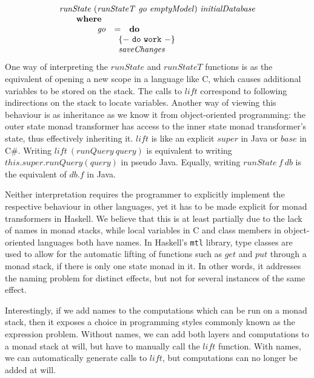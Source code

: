 \begin{displaymath}
\begin{array}{l}
\mathit{runState}~(\mathit{runStateT}~\mathit{go}~\mathit{emptyModel})~\mathit{initialDatabase} \\
\qquad \mathbf{where} \\
\qquad \qquad \begin{array}{lcl}
\mathit{go} & = & \mathbf{do} \\
\multicolumn{3}{l}{\qquad \begin{array}{l}
\mathtt{\{-~do~work~-\}}\\
\mathit{saveChanges}
\end{array}} 
\end{array}
\end{array}
\end{displaymath}
One way of interpreting the $\mathit{runState}$ and $\mathit{runStateT}$ functions is as the equivalent of opening a new scope in a language like C, which causes additional variables to be stored on the stack. The calls to $\mathit{lift}$ correspond to following indirections on the stack to locate variables. Another way of viewing this behaviour is as inheritance as we know it from object-oriented programming: the outer state monad transformer has access to the inner state monad transformer's state, thus effectively inheriting it. $\mathit{lift}$ is like an explicit $\mathit{super}$ in Java or $\mathit{base}$ in C\#. Writing $\mathit{lift}~(\mathit{runQuery}~\mathit{query})$ is equivalent to writing $\mathit{this}.\mathit{super}.\mathit{runQuery}(\mathit{query})$ in pseudo Java. Equally, writing $\mathit{runState}~f~\mathit{db}$ is the equivalent of $\mathit{db}.\mathit{f}$ in Java.

Neither interpretation requires the programmer to explicitly implement the respective behaviour in other languages, yet it has to be made explicit for monad transformers in Haskell. We believe that this is at least partially due to the lack of names in monad stacks, while local variables in C and class members in object-oriented languages both have names. In Haskell's \texttt{mtl} library, type classes are used to allow for the automatic lifting of functions such as $\mathit{get}$ and $\mathit{put}$ through a monad stack, if there is only one state monad in it. In other words, it addresses the naming problem for distinct effects, but not for several instances of the same effect.

Interestingly, if we add names to the computations which can be run on a monad stack, then it exposes a choice in programming styles commonly known as the expression problem\cite{wadler1998expression}. Without names, we can add both layers and computations to a monad stack at will, but have to manually call the $\mathit{lift}$ function. With names, we can automatically generate calls to $\mathit{lift}$, but computations can no longer be added at will.

